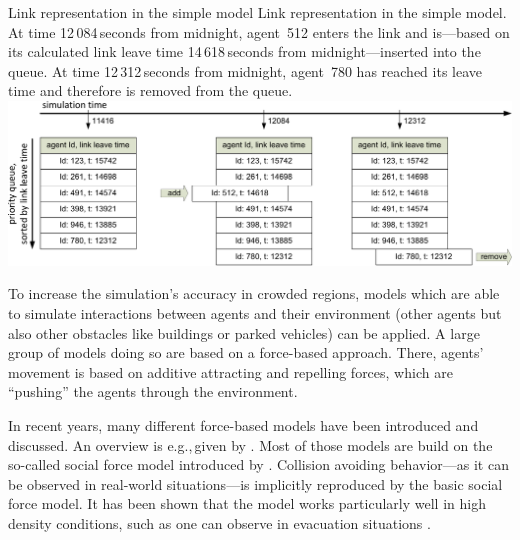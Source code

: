 \createfigure%
{Link representation in the simple model}%
{Link representation in the simple model. \\At time 12\,084\,seconds from midnight, agent~512 enters the link and is---based on its calculated link leave time 14\,618\,seconds from midnight---inserted into the queue. At time 12\,312\,seconds from midnight, agent~780 has reached its leave time and therefore is removed from the queue.}%
{\label{fig:linkRepresentationSimpleModel}}%
{\includegraphics[width=1.0\textwidth, angle=0]{extending/figures/MultiModalSimulation/linkRepresentation}}%
{}

To increase the simulation's accuracy in crowded regions, models which are able to simulate interactions between agents and their environment (other agents but also other obstacles like buildings or parked vehicles) can be applied. A large group of models doing so are based on a force-based approach. There, agents' movement is based on additive attracting and repelling forces, which are ``pushing'' the agents through the environment.

In recent years, many different force-based models have been introduced and discussed. An overview is e.g.,\,given by \citet{OlesonEtAl_BazzanKluegl_2009}. Most of those models are build on the so-called social force model introduced by \citet{HelbingMolnar_PhysRevE_1995}. Collision avoiding behavior---as it can be observed in real-world situations---is implicitly reproduced by the basic social force model. It has been shown that the model works particularly well in high density conditions, such as one can observe in evacuation situations \citep{HelbingEtAl_Nature_2000}.

